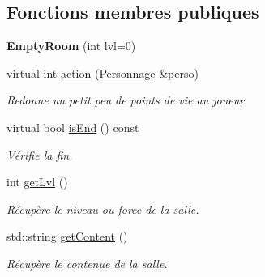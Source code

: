 \subsection*{Fonctions membres publiques}
\begin{DoxyCompactItemize}
\item 
\hypertarget{class_empty_room_adff09606225e39899242059db5d8e64e}{{\bfseries Empty\-Room} (int lvl=0)}\label{class_empty_room_adff09606225e39899242059db5d8e64e}

\item 
virtual int \hyperlink{class_empty_room_a31fdcab2da18636773d28f393e48cd7b}{action} (\hyperlink{class_personnage}{Personnage} \&perso)
\begin{DoxyCompactList}\small\item\em Redonne un petit peu de points de vie au joueur. \end{DoxyCompactList}\item 
virtual bool \hyperlink{class_room_comportement_a240991f90b07c35e0e9114e6a203ba88}{is\-End} () const 
\begin{DoxyCompactList}\small\item\em Vérifie la fin. \end{DoxyCompactList}\item 
int \hyperlink{class_room_comportement_a645473f228c0e73532a309ad512456eb}{get\-Lvl} ()
\begin{DoxyCompactList}\small\item\em Récupère le niveau ou force de la salle. \end{DoxyCompactList}\item 
std\-::string \hyperlink{class_room_comportement_a6927d638d17858a303d77b449c7552b4}{get\-Content} ()
\begin{DoxyCompactList}\small\item\em Récupère le contenue de la salle. \end{DoxyCompactList}\end{DoxyCompactItemize}
